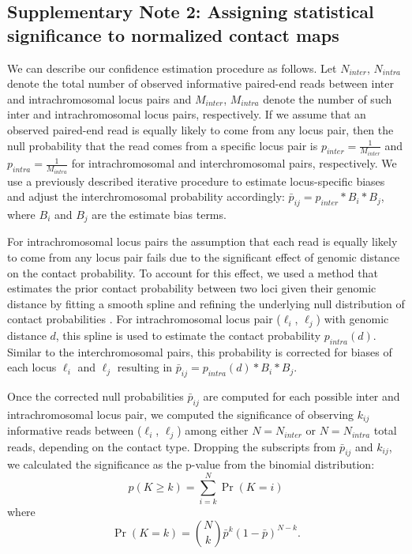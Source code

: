 \subsection*{Supplementary Note 2: Assigning statistical significance to normalized contact maps}
\label{supp:fithic}

We can describe our confidence estimation procedure as follows. Let
$N_{inter}$, $N_{intra}$ denote the total number of observed informative
paired-end reads between inter and intrachromosomal locus pairs and
$M_{inter}$, $M_{intra}$ denote the number of such inter and intrachromosomal
locus pairs, respectively. If we assume that an observed paired-end read is
equally likely to come from any locus pair, then the null probability that the
read comes from a specific locus pair is $p_{inter}=\frac{1}{M_{inter}}$ and
$p_{intra}=\frac{1}{M_{intra}}$ for intrachromosomal and interchromosomal
pairs, respectively. We use a previously described iterative procedure
\citep{imakaev:iterative} to estimate locus-specific biases and adjust the
interchromosomal probability accordingly: $\bar{p}_{ij} = p_{inter}* B_i *
B_j$, where $B_i$ and $B_j$ are the estimate bias terms.

For intrachromosomal locus pairs the assumption that each read is equally
likely to come from any locus pair fails due to the significant effect of
genomic distance on the contact probability. To account for this effect, we
used a method that estimates the prior contact probability between two loci
given their genomic distance by fitting a smooth spline and refining the
underlying null distribution of contact probabilities \citep{ay:statistical}.
For intrachromosomal locus pair ($\ell_i$, $\ell_j$) with genomic distance
$d$, this spline is used to estimate the contact probability $p_{intra}(d)$.
Similar to the interchromosomal pairs, this probability is corrected for
biases of each locus $\ell_i$ and $\ell_j$ resulting in $\bar{p}_{ij} =
p_{intra}(d)* B_i * B_j$.

Once the corrected null probabilities $\bar{p}_{ij}$ are computed for each
possible inter and intrachromosomal locus pair, we computed the significance
of observing $k_{ij}$ informative reads between ($\ell_i$, $\ell_j$) among
either $N=N_{inter}$ or $N=N_{intra}$ total reads, depending on the contact type.
Dropping the subscripts from $\bar{p}_{ij}$ and $k_{ij}$, we calculated the
significance as the p-value from the binomial distribution:
\begin{equation}
p(K\ge k) = \sum_{i=k}^N \Pr(K = i)
\label{equation:disc-pvalue}
\end{equation} where $$\Pr(K=k) = {N \choose k} \bar{p}^k \left(1 - \bar{p}\right)^{N-k}.$$

